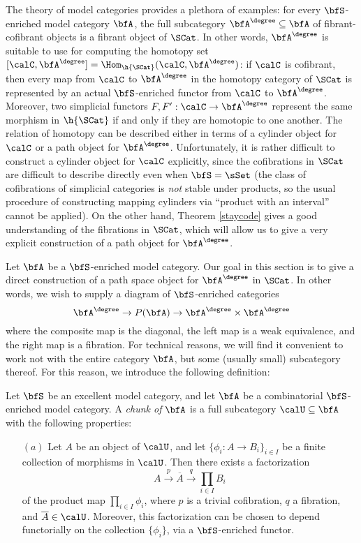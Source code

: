 \begin{Simplicial Categories}
The theory of model categories provides a plethora of examples:
for every $\bfS$-enriched model category $\bfA$, the full subcategory $\bfA^{\degree} \subseteq \bfA$ of fibrant-cofibrant objects is a fibrant object of $\SCat$.
In other words, $\bfA^{\degree}$ is suitable to use for computing the homotopy set $[\calC, \bfA^{\degree}] = \Hom_{ \h{\SCat} }( \calC, \bfA^{\degree})$: if $\calC$ is cofibrant, then every map from $\calC$ to $\bfA^{\degree}$ in the homotopy category of $\SCat$ is represented by an actual $\bfS$-enriched functor from $\calC$ to $\bfA^{\degree}$. Moreover, two simplicial functors $F,F': \calC \rightarrow \bfA^{\degree}$ represent the same morphism
in $\h{\SCat}$ if and only if they are homotopic to one another. The relation of homotopy can be described either in terms of a cylinder object for $\calC$ or a path object for $\bfA^{\degree}$. Unfortunately, it is rather difficult to construct a cylinder object for $\calC$ explicitly, since the cofibrations in $\SCat$ are difficult to describe directly even when $\bfS = \sSet$ (the class of cofibrations of simplicial categories is {\em not} stable under products, so the usual procedure of
constructing mapping cylinders via ``product with an interval'' cannot be applied). 
On the other hand, Theorem \ref{staycode} gives a good understanding of the fibrations
in $\SCat$, which will allow us to give a very explicit construction of a path object for $\bfA^{\degree}$.

Let $\bfA$ be a $\bfS$-enriched model category. Our goal in this section is to give a direct construction of a path space object for $\bfA^{\degree}$ in $\SCat$. In other words, we wish to supply
a diagram of $\bfS$-enriched categories $$\bfA^{\degree} \rightarrow P( \bfA )
\rightarrow \bfA^{\degree} \times \bfA^{\degree}$$
where the composite map is the diagonal, the left map is a weak equivalence, and the right map is a fibration. For technical reasons, we will find it convenient to work not with the entire
category $\bfA$, but some (usually small) subcategory thereof. For this reason, we
introduce the following definition:

\begin{definition}\label{defchunk}
Let $\bfS$ be an excellent model category, and let $\bfA$ be a
combinatorial $\bfS$-enriched model category. A {\it chunk of $\bfA$}
is a full subcategory $\calU \subseteq \bfA$ with the following properties:
\begin{itemize}
\item[$(a)$] Let $A$ be an object of $\calU$, and let $\{ \phi_i: A \rightarrow B_i \}_{i \in I}$ be a finite
collection of morphisms in $\calU$. Then there exists a factorization
$$ A \stackrel{p}{\rightarrow} \overline{A} \stackrel{q}{\rightarrow} \prod_{i \in I} B_i$$
of the product map $\prod_{i \in I} \phi_i$,
where $p$ is a trivial cofibration, $q$ a fibration, and $\overline{A} \in \calU$.
Moreover, this factorization can be chosen to depend functorially on the collection
$\{ \phi_i \}$, via a $\bfS$-enriched functor.


\end{itemize}
\end{definition}
\end{Simplicial Categories}
